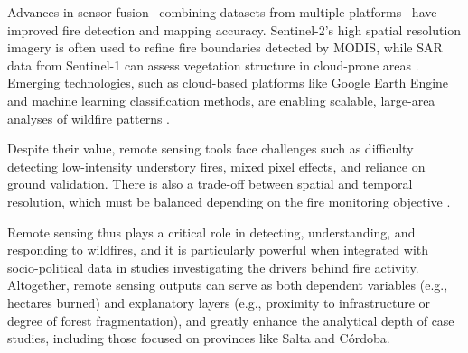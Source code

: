 Advances in sensor fusion --combining datasets from multiple platforms-- have improved fire detection and mapping accuracy. Sentinel-2’s high spatial resolution imagery is often used to refine fire boundaries detected by MODIS, while SAR data from Sentinel-1 can assess vegetation structure in cloud-prone areas \cite{tanase2015}. Emerging technologies, such as cloud-based platforms like Google Earth Engine and machine learning classification methods, are enabling scalable, large-area analyses of wildfire patterns \cite{silva2019,cochrane2003}.

Despite their value, remote sensing tools face challenges such as difficulty detecting low-intensity understory fires, mixed pixel effects, and reliance on ground validation. There is also a trade-off between spatial and temporal resolution, which must be balanced depending on the fire monitoring objective \cite{chuvieco2010}.

Remote sensing thus plays a critical role in detecting, understanding, and responding to wildfires, and it is particularly powerful when integrated with socio-political data in studies investigating the drivers behind fire activity.  Altogether, remote sensing outputs can serve as both dependent variables (e.g., hectares burned) and explanatory layers (e.g., proximity to infrastructure or degree of forest fragmentation), and greatly enhance the analytical depth of case studies, including those focused on provinces like Salta and Córdoba.